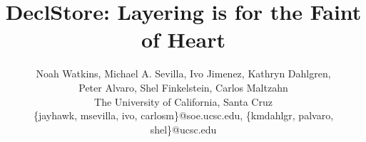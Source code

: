 \documentclass[letterpaper,twocolumn,10pt]{article}
\begin{document}

\title{DeclStore: Layering is for the Faint of Heart}

\author{
    {\rm Noah Watkins, Michael A. Sevilla, Ivo Jimenez, Kathryn Dahlgren,}\\
{\rm Peter Alvaro, Shel Finkelstein, Carlos Maltzahn}\\
The University of California, Santa Cruz\\
\{jayhawk, msevilla, ivo, carlosm\}@soe.ucsc.edu, \{kmdahlgr, palvaro, shel\}@ucsc.edu
} %

\maketitle

\thispagestyle{empty}










{\footnotesize 
}
\end{document}
